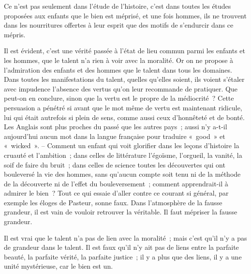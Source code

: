 \documentclass[french,twoside]{book} %
\begin{document}
Ce n'est pas seulement dans l'étude de l'histoire, c'est dans toutes les études proposées aux enfants que le bien est méprisé, et une fois hommes, ils ne trouvent dans les nourritures offertes à leur esprit que des motifs de s'endurcir dans ce mépris.\par
Il est évident, c'est une vérité passée à l'état de lieu commun parmi les enfants et les hommes, que le talent n'a rien à voir avec la moralité. Or on ne propose à l'admiration des enfants et des hommes que le talent dans tous les domaines. Dans toutes les manifestations du talent, quelles qu'elles soient, ils voient s'étaler avec impudence l'absence des vertus qu'on leur recommande de pratiquer. Que peut-on en conclure, sinon que la vertu est le propre de la médiocrité ? Cette persuasion a pénétré si avant que le mot même de vertu est maintenant ridicule, lui qui était autrefois si plein de sens, comme aussi ceux d'honnêteté et de bonté. Les Anglais sont plus proches du passé que les autres pays ; aussi n'y a-t-il aujourd'hui aucun mot dans la langue française pour traduire « good » et « wicked ». – Comment un enfant qui voit glorifier dans les leçons d'histoire la cruauté et l'ambition ; dans celles de littérature l'égoïsme, l'orgueil, la vanité, la soif de faire du bruit ; dans celles de science toutes les découvertes qui ont bouleversé la vie des hommes, sans qu'aucun compte soit tenu ni de la méthode de la découverte ni de l'effet du bouleversement ; comment apprendrait-il à admirer le bien ? Tout ce qui essaie d'aller contre ce courant si général, par exemple les éloges de Pasteur, sonne faux. Dans l'atmosphère de la fausse grandeur, il est vain de vouloir retrouver la véritable. Il faut mépriser la fausse grandeur.\par
Il est vrai que le talent n'a pas de lien avec la moralité ; mais c'est qu'il n'y a pas de grandeur dans le talent. Il est faux qu'il n'y ait pas de liens entre la parfaite beauté, la parfaite vérité, la parfaite justice ; il y a plus que des liens, il y a une unité mystérieuse, car le bien est un.\par
\end{document}
